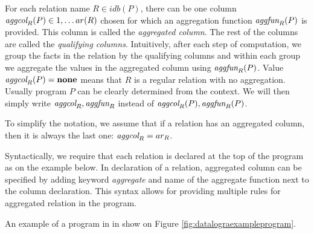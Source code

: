 For each relation name $R \in idb(P)$, there can be one column $\textit{aggcol}_R(P) \in {1, \dots ar(R)}$ chosen for which an aggregation function $\textit{aggfun}_R(P)$ is provided. This column is called the \emph{aggregated column}. The rest of the columns are called the \emph{qualifying columns}. Intuitively, after each step of computation, we group the facts in the relation by the qualifying columns and within each group we aggregate the values in the aggregated column using $\textit{aggfun}_R(P)$. Value $\textit{aggcol}_R(P) = \bf{none}$ means that $R$ is a regular relation with no aggregation. Usually program $P$ can be clearly determined from the context. We will then simply write $\textit{aggcol}_R, \textit{aggfun}_R$ instead of $\textit{aggcol}_R(P), \textit{aggfun}_R(P)$.

To simplify the notation, we assume that if a relation has an aggregated column, then it is always the last one: $\textit{aggcol}_R = ar_R$.

Syntactically, we require that each \idb relation is declared at the top of the program as on the example below.
In declaration of a relation, aggregated column can be specified by adding keyword \textit{aggregate} and name of the aggregate function next to the column declaration. This syntax allows for providing multiple rules for aggregated relation in the program.

An example of a program in \datalogra in show on Figure \ref{fig:datalograexampleprogram}.

\begin{figure}[h!]
\end{figure}\label{fig:datalograexampleprogram}


